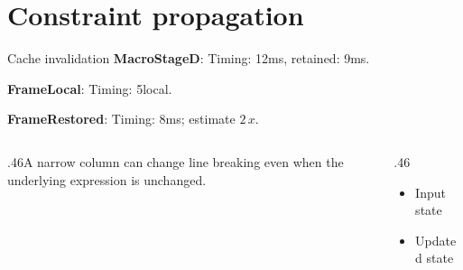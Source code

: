 \documentclass[10pt,aspectratio=169]{beamer}
\newcommand{\fuzzlayerA}[1]{\textbf{#1}}
\newcommand{\fuzzlayerB}[1]{\fuzzlayerA{#1}}
\newcommand{\fuzzlayerC}[1]{\fuzzlayerB{#1}}
\newcommand{\fuzzterm}[1]{\fuzzlayerC{#1}}
\newcommand{\fuzzpair}[2]{\fuzzterm{#1}: #2}
\newcommand{\fuzzunit}{ms}
\let\fuzzoriginalunit\fuzzunit
\newcommand{\fuzzcoefficient}{2}
\newcommand{\fuzzscale}[2][\fuzzcoefficient]{#1\,#2}
\begin{document}
\section{Constraint propagation}
\begin{frame}[t]{Cache invalidation}
\fuzzpair{MacroStageD}{Timing: 12\fuzzunit, retained: 9\fuzzoriginalunit.}\par
{\renewcommand{\fuzzunit}{local}\fuzzpair{FrameLocal}{Timing: 5\fuzzunit.}\par}
\fuzzpair{FrameRestored}{Timing: 8\fuzzunit; estimate $\fuzzscale{x}$.}\par
\begin{columns}[T]\begin{column}{.46\textwidth}A narrow column can change line breaking even when the underlying expression is unchanged.\end{column}\begin{column}{.46\textwidth}\begin{itemize}\item Input state\item Updated state\end{itemize}\end{column}\end{columns}
\end{frame}
\end{document}

